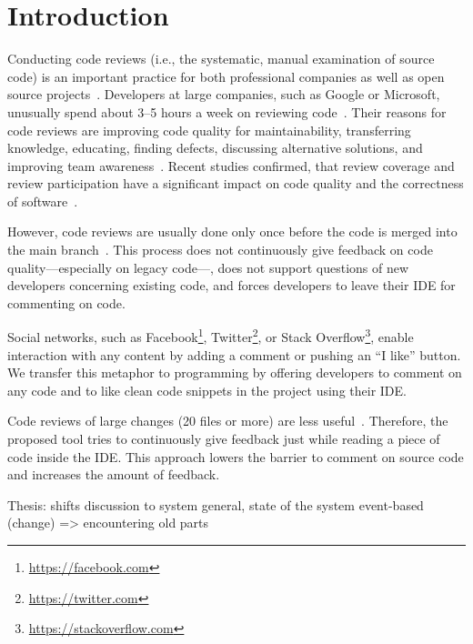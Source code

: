 
\section{Introduction}
Conducting code reviews (i.e., the systematic, manual examination of source code) is an important practice for both professional companies as well as open source projects~\cite{balachandran2013PeerCodeReviews, bird2015CodeReviewPlatform, czerwonka2015codereviews, rigby2014PeerReviewOSS, feitelson2013development, rigby2013PeerCodeReviews}.
%
Developers at large companies, such as Google or Microsoft, unusually spend about 3--5 hours a week on reviewing code~\cite{bosu2017ContemporaryCodeReview,Sadowski2018Google}.
%
Their reasons for code reviews are improving code quality for maintainability, transferring knowledge, educating, finding defects, discussing alternative solutions, and improving team awareness~\cite{rigby2013PeerCodeReviews, bacchelli2013expectations, bosu2017ContemporaryCodeReview, Sadowski2018Google}.
%
Recent studies confirmed, that review coverage and review participation have a significant impact on code quality and the correctness of software~\cite{mcintosh2014impact, mcintosh2016empirical, thongtanunam2015CodeReviews, shimagaki2016CRInSony}. 
%

%
However, code reviews are usually done only once before the code is merged into the main branch~\cite{rigby2013PeerCodeReviews, Sadowski2018Google}. 
%
This process does not continuously give feedback on code quality---especially on legacy code---, does not support questions of new developers concerning existing code, and forces developers to leave their IDE for commenting on code.
%


%
Social networks, such as Facebook\footnote{\url{https://facebook.com}}, Twitter\footnote{\url{https://twitter.com}}, or Stack Overflow\footnote{\url{https://stackoverflow.com}}, enable interaction with any content by adding a comment or pushing an \enquote{I like} button.
% 
We transfer this metaphor to programming by offering developers to comment on any code and to like clean code snippets in the project using their IDE.  
%

%
Code reviews of large changes (20 files or more) are less useful~\cite{czerwonka2015codereviews}.
%
Therefore, the proposed tool tries to continuously give feedback just while reading a piece of code inside the IDE. 
%
This approach lowers the barrier to comment on source code and increases the amount of feedback.
%
%



Thesis: shifts discussion to system general, state of the system
event-based (change) => encountering old parts